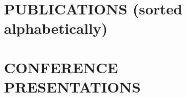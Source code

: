 \documentclass[overlapped, line, 10pt]{res} %
\begin{document}
\begin{resume}

\section{PUBLICATIONS (sorted alphabetically)}

\nocite{*}



\section{CONFERENCE PRESENTATIONS}


\end{resume}
\end{document}
